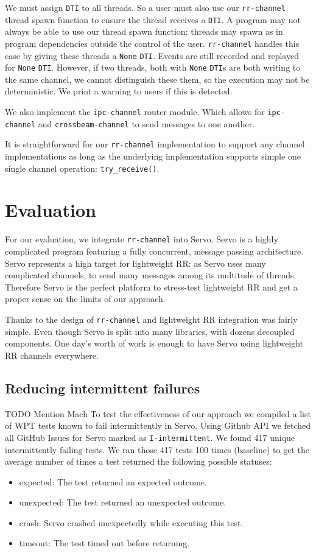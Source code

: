 \documentclass{article}
\begin{document}
We must assign \texttt{DTI} to all threads. So a user must also use our
\texttt{rr-channel} thread spawn function to ensure the thread receives a \texttt{DTI}. A
program may not always be able to use our thread spawn function: threads may spawn as in
program dependencies outside the control of the user. \texttt{rr-channel} handles this
case by giving these threads
a \texttt{None} \texttt{DTI}. Events are still recorded and replayed for \texttt{None}
\texttt{DTI}. However, if two threads, both with \texttt{None} \texttt{DTI}s are both
writing to the same channel, we cannot distinguish these them, so the execution may not
be deterministic. We print a warning to users if this is detected.

We also implement the \texttt{ipc-channel} router module. Which allows for
\texttt{ipc-channel} and \texttt{crossbeam-channel} to send messages to one another.

It is straightforward for our \texttt{rr-channel} implementation to support
any channel implementations as long as the underlying implementation supports simple
one single channel operation: \texttt{try\_receive()}.

\section{Evaluation}
For our evaluation, we integrate \texttt{rr-channel} into Servo. Servo is a
highly complicated program featuring a fully concurrent, message passing architecture.
Servo represents a high target for lightweight RR: as Servo uses many complicated channels, to send many messages among its multitude of threads.
Therefore Servo is the perfect platform to stress-test lightweight RR and get
a proper sense on the limits of our approach.

Thanks to the design of \texttt{rr-channel} and lightweight RR integration was fairly simple.
Even though Servo is split into many libraries, with dozens decoupled components. One
day's worth of work is enough to have Servo using lightweight RR channels everywhere.

\subsection{Reducing intermittent failures}
TODO Mention Mach
To test the effectiveness of our approach we compiled a list of WPT tests known to
fail intermittently in Servo. Using Github API we fetched all GitHub Issues for Servo
marked as \texttt{I-intermittent}. We found 417 unique intermittently failing tests.
We ran those 417 tests 100 times (baseline) to get the average number of times a
test returned the following possible statuses:
\begin{itemize}
  \item expected: The test returned an expected outcome.
  \item unexpected: The test returned an unexpected outcome.
  \item crash: Servo crashed unexpectedly while executing this test.
  \item timeout: The test timed out before returning.
\end{itemize}
\end{document}
